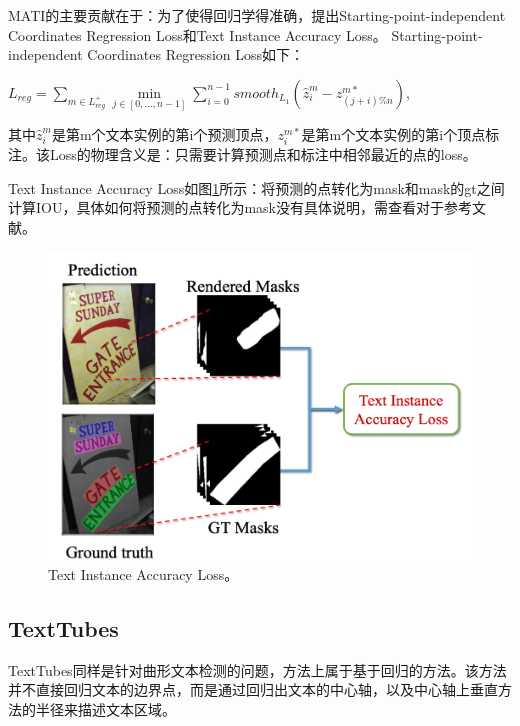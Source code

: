 MATI的主要贡献在于：为了使得回归学得准确，提出Starting-point-independent Coordinates Regression Loss和Text Instance Accuracy Loss。
Starting-point-independent Coordinates Regression Loss如下：

$L_{reg} = \sum\limits_{m\in L_{reg}^{+}} \mathop{min}\limits_{j \in [0,...,n-1]} \sum\limits_{i=0}^{n-1} smooth_{L_{1}} (\hat{z}_{i}^{m} - z_{(j+i)\%n}^{m*})$,

其中$\hat{z}_{i}^{m}$是第m个文本实例的第i个预测顶点，$z_{i}^{m*}$是第m个文本实例的第i个顶点标注。该Loss的物理含义是：只需要计算预测点和标注中相邻最近的点的loss。

Text Instance Accuracy Loss如图\ref{mati_textrender}所示：将预测的点转化为mask和mask的gt之间计算IOU，具体如何将预测的点转化为mask没有具体说明，需查看对于参考文献。
\begin{figure}[H]
    \centering
    \includegraphics[width=.7\textwidth]{figure/detection/mati_textrender.png} 
    \caption{Text Instance Accuracy Loss。} 
    \label{mati_textrender} 
\end{figure}

\subsection{TextTubes}
TextTubes\cite{seytre2019texttubes}同样是针对曲形文本检测的问题，方法上属于基于回归的方法。该方法并不直接回归文本的边界点，而是通过回归出文本的中心轴，以及中心轴上垂直方法的半径来描述文本区域。


